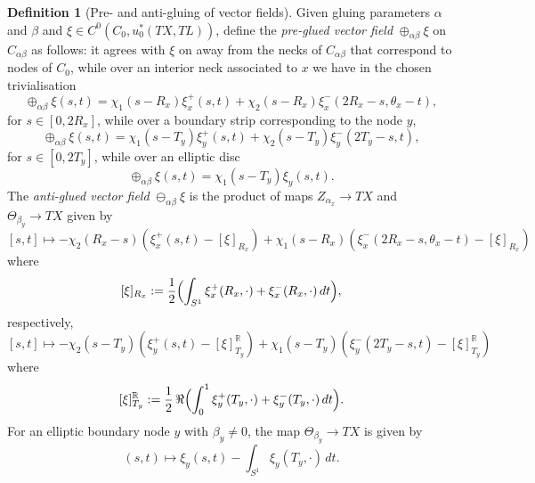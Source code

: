 \documentclass[11pt,psamsfonts, oneside, reqno]{amsart}
\newcommand{\lbr}[1]{\Bigl(#1\Bigr)}
\newcommand{\bR}{\mathbb{R}}
\theoremstyle{definition}
\newtheorem{definition}[theorem]{Definition}
\theoremstyle{remark}
\numberwithin{equation}{section}
\begin{document}
\begin{definition}[Pre- and anti-gluing of vector fields]\label{}
	Given gluing parameters $\alpha$ and $\beta$ and $\xi \in C^0(C_0,u_0^*(TX,TL))$, define the \emph{pre-glued vector field} $\oplus_{\alpha\beta} \xi$ on $C_{\alpha\beta}$ as follows: it agrees with $\xi$ on away from the necks of $C_{\alpha\beta}$ that correspond to nodes of $C_0$, while over an interior neck associated to $x$ we have in the chosen trivialisation
	\begin{equation*}\label{}\oplus_{\alpha\beta} \xi(s,t) = 
		\chi_1(s-R_x)\xi^+_x(s,t)+\chi_2(s-R_x)\xi^-_x(2R_x-s,\theta_x-t), \end{equation*}
	for $s \in [0,2R_x]$, while over a boundary strip corresponding to the node $y$,
	\begin{equation*}\label{}\oplus_{\alpha\beta} \xi(s,t) = 
		\chi_1(s-T_y)\xi^+_y(s,t)+\chi_2(s-T_y)\xi^-_y(2T_y-s,t), \end{equation*}
	for $s \in [0,2T_y]$, while over an elliptic disc
	\begin{equation*}\label{}\oplus_{\alpha\beta} \xi(s,t) = \chi_1(s-T_y)\xi_y(s,t).\end{equation*}
	The \emph{anti-glued vector field} $\ominus_{\alpha\beta}\xi$ is the product of maps $Z_{\alpha_x}\to TX$ and $\Theta_{\beta_y}\to TX$ given by 
	\begin{equation*}\label{} [s,t]\mapsto 
		-\chi_2(R_x-s)(\xi^+_x(s,t)-[\xi]_{R_x}) + \chi_1(s-R_x)(\xi^-_x(2R_x-s,\theta_x-t)-[\xi]_{R_x}) 
	\end{equation*}
	where 
	$$[\xi]_{R_x} := \frac{1}{2}\lbr{\int_{S^1}\xi^+_x(R_x,\cdot) +\xi^-_x(R_x,\cdot)\,dt},$$\noindent
	respectively, 
	\begin{equation*}\label{} [s,t] \mapsto 
		-\chi_2(s-T_y)(\xi^+_y(s,t)-[\xi]_{T_y}^\bR) + \chi_1(s-T_y)(\xi^-_y(2T_y-s,t)-[\xi]_{T_y}^\bR) 
	\end{equation*}
	where 
	$$[\xi]_{T_y}^\bR := \frac{1}{2}\,\Re\lbr{\int_{0}^1\xi^+_y(T_y,\cdot) +\xi^-_y(T_y,\cdot)\,dt}.$$\noindent
	For an elliptic boundary node $y$ with $\beta_y \neq 0$, the map $\Theta_{\beta_y}\to TX$ is given by
	$$(s,t)\mapsto \xi_y(s,t)-\int_{S^1}\xi_y(T_y,\cdot)\,dt.$$
\end{definition}
 
\end{document}
